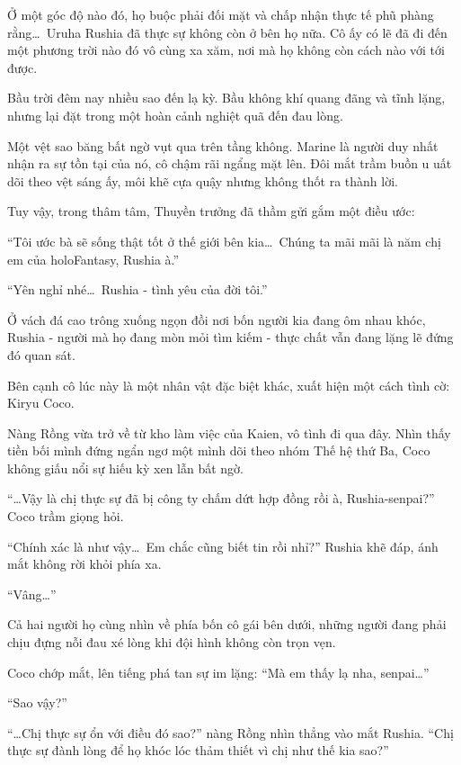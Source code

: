 \documentclass[../main.tex]{subfiles}
\begin{document}
Ở một góc độ nào đó, họ buộc phải đối mặt và chấp nhận thực tế phũ phàng rằng\dots\ Uruha Rushia đã thực sự không còn ở bên họ nữa. Cô ấy có lẽ đã đi đến một phương trời nào đó vô cùng xa xăm, nơi mà họ không còn cách nào với tới được.

Bầu trời đêm nay nhiều sao đến lạ kỳ. Bầu không khí quang đãng và tĩnh lặng, nhưng lại đặt trong một hoàn cảnh nghiệt quã đến đau lòng.

Một vệt sao băng bất ngờ vụt qua trên tầng không. Marine là người duy nhất nhận ra sự tồn tại của nó, cô chậm rãi ngẩng mặt lên. Đôi mắt trầm buồn u uất dõi theo vệt sáng ấy, môi khẽ cựa quậy nhưng không thốt ra thành lời.

Tuy vậy, trong thâm tâm, Thuyền trưởng đã thầm gửi gắm một điều ước:

``Tôi ước bà sẽ sống thật tốt ở thế giới bên kia\dots\ Chúng ta mãi mãi là năm chị em của holoFantasy, Rushia à.''

\begin{center}
    ``Yên nghỉ nhé\dots\ Rushia - tình yêu của đời tôi.''
\end{center}

Ở vách đá cao trông xuống ngọn đồi nơi bốn người kia đang ôm nhau khóc, Rushia - người mà họ đang mòn mỏi tìm kiếm - thực chất vẫn đang lặng lẽ đứng đó quan sát.

Bên cạnh cô lúc này là một nhân vật đặc biệt khác, xuất hiện một cách tình cờ: Kiryu Coco.

Nàng Rồng vừa trở về từ kho làm việc của Kaien, vô tình đi qua đây. Nhìn thấy tiền bối mình đứng ngẩn ngơ một mình dõi theo nhóm Thế hệ thứ Ba, Coco không giấu nổi sự hiếu kỳ xen lẫn bất ngờ.

``\dots Vậy là chị thực sự đã bị công ty chấm dứt hợp đồng rồi à, Rushia-senpai?'' Coco trầm giọng hỏi.

``Chính xác là như vậy\dots\ Em chắc cũng biết tin rồi nhỉ?'' Rushia khẽ đáp, ánh mắt không rời khỏi phía xa.

``Vâng\dots''

Cả hai người họ cùng nhìn về phía bốn cô gái bên dưới, những người đang phải chịu đựng nỗi đau xé lòng khi đội hình không còn trọn vẹn.

Coco chớp mắt, lên tiếng phá tan sự im lặng: ``Mà em thấy lạ nha, senpai\dots''

``Sao vậy?''

``\dots Chị thực sự ổn với điều đó sao?'' nàng Rồng nhìn thẳng vào mắt Rushia. ``Chị thực sự đành lòng để họ khóc lóc thảm thiết vì chị như thế kia sao?''
\end{document}
